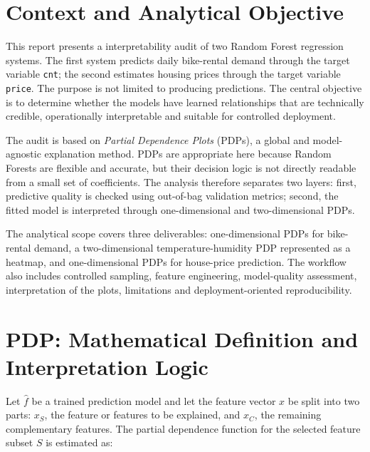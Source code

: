 \documentclass[
]{article}
\begin{document}
\tableofcontents
\newpage

\setcounter{page}{1}

\section{Context and Analytical Objective}
\label{executive-context-and-analytical-objective}

This report presents a interpretability audit of two Random Forest regression systems. The first system predicts daily bike-rental demand through the target variable \texttt{cnt}; the second estimates housing prices through the target variable \texttt{price}. The purpose is not limited to producing predictions. The central objective is to determine whether the models have learned relationships that are technically credible, operationally interpretable and suitable for controlled deployment.

The audit is based on \textit{Partial Dependence Plots} (PDPs), a global and model-agnostic explanation method. PDPs are appropriate here because Random Forests are flexible and accurate, but their decision logic is not directly readable from a small set of coefficients. The analysis therefore separates two layers: first, predictive quality is checked using out-of-bag validation metrics; second, the fitted model is interpreted through one-dimensional and two-dimensional PDPs.

The analytical scope covers three deliverables: one-dimensional PDPs for bike-rental demand, a two-dimensional temperature-humidity PDP represented as a heatmap, and one-dimensional PDPs for house-price prediction. The workflow also includes controlled sampling, feature engineering, model-quality assessment, interpretation of the plots, limitations and deployment-oriented reproducibility.

\section{PDP: Mathematical Definition and Interpretation Logic}
\label{pdp-mathematical-definition-and-interpretation-logic}

Let $\hat{f}$ be a trained prediction model and let the feature vector $x$ be split into two parts: $x_S$, the feature or features to be explained, and $x_C$, the remaining complementary features. The partial dependence function for the selected feature subset $S$ is estimated as:
\end{document}

